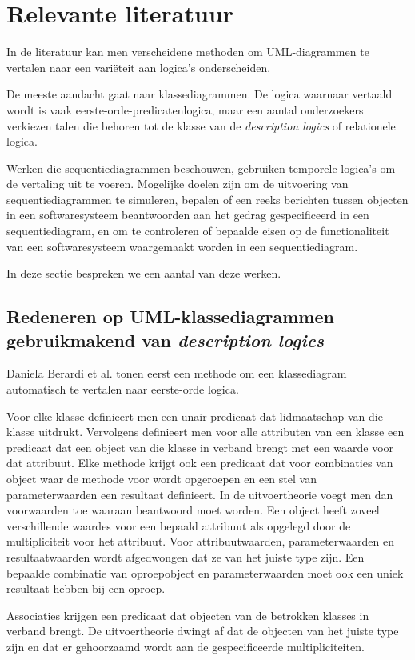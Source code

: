 \chapter{Relevante literatuur}\label{sec:literatuur}
In de literatuur kan men verscheidene methoden om UML-diagrammen te vertalen naar een vari\"eteit aan logica's onderscheiden.

De meeste aandacht gaat naar klassediagrammen. De logica waarnaar vertaald wordt is vaak eerste-orde-predicatenlogica, maar een aantal onderzoekers verkiezen talen die behoren tot de klasse van de \textit{description logics} of relationele logica.

Werken die sequentiediagrammen beschouwen, gebruiken temporele logica's om de vertaling uit te voeren. Mogelijke doelen zijn om de uitvoering van sequentiediagrammen te simuleren, bepalen of een reeks berichten tussen objecten in een softwaresysteem beantwoorden aan het gedrag gespecificeerd in een sequentiediagram, en om te controleren of bepaalde eisen op de functionaliteit van een softwaresysteem waargemaakt worden in een sequentiediagram.

In deze sectie bespreken we een aantal van deze werken.

\section{Redeneren op UML-klassediagrammen gebruikmakend van \textit{description logics}}
Daniela Berardi et al.\cite{BerardiDaniela2005RoUc} tonen eerst een methode om een klassediagram automatisch te vertalen naar eerste-orde logica.

Voor elke klasse definieert men een unair predicaat dat lidmaatschap van die klasse uitdrukt. Vervolgens definieert men voor alle attributen van een klasse een predicaat dat een object van die klasse in verband brengt met een waarde voor dat attribuut. Elke methode krijgt ook een predicaat dat voor combinaties van object waar de methode voor wordt opgeroepen en een stel van parameterwaarden een resultaat definieert. In de uitvoertheorie voegt men dan voorwaarden toe waaraan beantwoord moet worden. Een object heeft zoveel verschillende waardes voor een bepaald attribuut als opgelegd door de multipliciteit voor het attribuut. Voor attribuutwaarden, parameterwaarden en resultaatwaarden wordt afgedwongen dat ze van het juiste type zijn. Een bepaalde combinatie van oproepobject en parameterwaarden moet ook een uniek resultaat hebben bij een oproep.

Associaties krijgen een predicaat dat objecten van de betrokken klasses in verband brengt. De uitvoertheorie dwingt af dat de objecten van het juiste type zijn en dat er gehoorzaamd wordt aan de gespecificeerde multipliciteiten.

